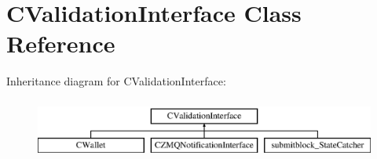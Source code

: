 \hypertarget{class_c_validation_interface}{}\section{C\+Validation\+Interface Class Reference}
\label{class_c_validation_interface}
Inheritance diagram for C\+Validation\+Interface\+:\begin{figure}[H]
\begin{center}
\leavevmode
\includegraphics[height=2.000000cm]{class_c_validation_interface}
\end{center}
\end{figure}
